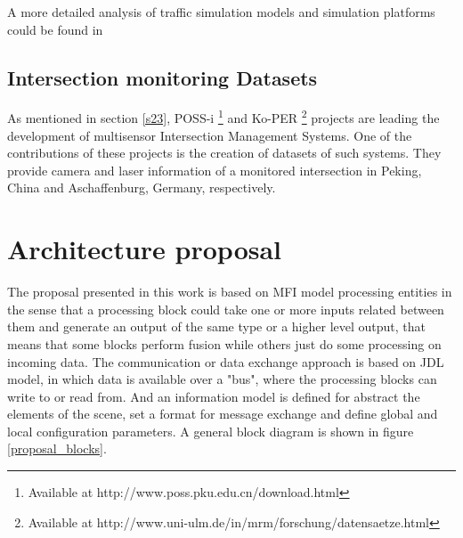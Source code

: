 
A more detailed analysis of traffic simulation models and simulation platforms could be found in \cite{AdamsBoxill2000, Barcelo2000, Kitamura2005, Lieberman1992}




\subsection{Intersection monitoring Datasets} \label{possi_ds}

As mentioned in section \ref{s23}, POSS-i \footnote{Available at http://www.poss.pku.edu.cn/download.html} and Ko-PER \footnote{Available at http://www.uni-ulm.de/in/mrm/forschung/datensaetze.html} projects are leading the development of multisensor Intersection Management Systems. One of the contributions of these projects is the creation of datasets of such systems. They provide camera and laser information of a monitored intersection in Peking, China and Aschaffenburg, Germany, respectively.

%
%
%
%
%
%

\section{Architecture proposal}

The proposal presented in this work is based on MFI model processing entities in the sense that a processing block could take one or more inputs related between them and generate an output of the same type or a higher level output, that means that some blocks perform fusion while others just do some processing on incoming data. The communication or data exchange approach is based on JDL model, in which data is available over a "bus", where the processing blocks can write to or read from. And an information model is defined for abstract the elements of the scene, set a format for message exchange and define global and local configuration parameters. A general block diagram is shown in figure \ref{proposal_blocks}.

